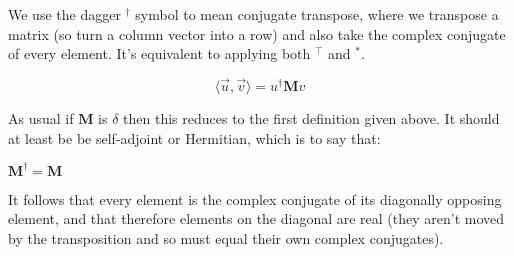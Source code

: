 We use the dagger $^\dagger$ symbol to mean conjugate transpose, where we transpose a matrix (so turn a column vector into a row) and also take the complex conjugate of every element. It's equivalent to applying both $^\intercal$ and $^*$.

$$
\langle \vec{u}, \vec{v} \rangle
=
u^\dagger \mathbf{M} v
$$

As usual if $\mathbf{M}$ is $\delta$ then this reduces to the first definition given above. It should at least be be self-adjoint or Hermitian, which is to say that:

$\mathbf{M}^\dagger = \mathbf{M}$

It follows that every element is the complex conjugate of its diagonally opposing element, and that therefore elements on the diagonal are real (they aren't moved by the transposition and so must equal their own complex conjugates).
